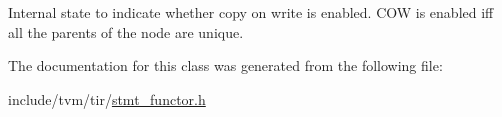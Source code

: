 Internal state to indicate whether copy on write is enabled. C\+OW is enabled iff all the parents of the node are unique. 



The documentation for this class was generated from the following file\+:\begin{DoxyCompactItemize}
\item 
include/tvm/tir/\hyperlink{stmt__functor_8h}{stmt\+\_\+functor.\+h}\end{DoxyCompactItemize}
